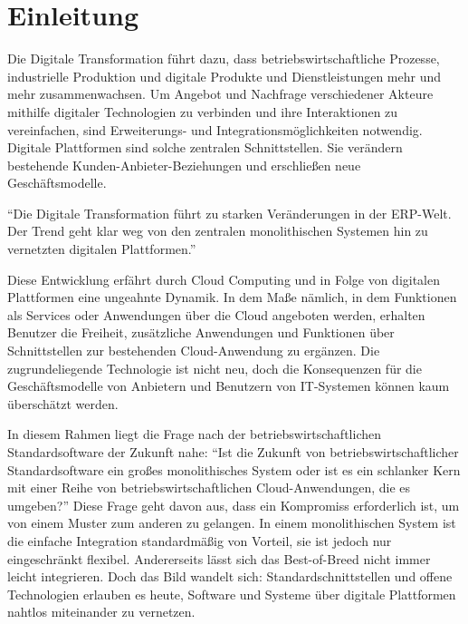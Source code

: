 \chapter{Einleitung}

Die Digitale Transformation führt dazu, dass betriebswirtschaftliche Prozesse, industrielle Produktion und digitale Produkte und Dienstleistungen mehr und mehr zusammenwachsen. Um Angebot und Nachfrage verschiedener Akteure mithilfe digitaler Technologien zu verbinden und ihre Interaktionen zu vereinfachen, sind Erweiterungs- und Integrationsmöglichkeiten notwendig. Digitale Plattformen sind solche zentralen Schnittstellen. Sie verändern bestehende Kunden-Anbieter-Beziehungen und erschließen neue Geschäftsmodelle.
\autocite{Densborn.2018}

\epigraph{
\enquote{Die Digitale Transformation führt zu starken Veränderungen in der ERP-Welt. Der Trend geht klar weg von den zentralen monolithischen Systemen hin zu vernetzten digitalen Plattformen.}
\autocite{bitkom.2018}
}{}

Diese Entwicklung erfährt durch Cloud Computing und in Folge von digitalen Plattformen eine ungeahnte Dynamik. In dem Maße nämlich, in dem Funktionen als Services oder Anwendungen über die Cloud angeboten werden, erhalten Benutzer die Freiheit, zusätzliche Anwendungen und Funktionen über Schnittstellen zur bestehenden Cloud-Anwendung zu ergänzen. Die zugrundeliegende Technologie ist nicht neu, doch die Konsequenzen für die Geschäftsmodelle von Anbietern und Benutzern von \acs{IT}-Systemen können kaum überschätzt werden.
\autocite{bitkom.2018}

In diesem Rahmen liegt die Frage nach der betriebswirtschaftlichen Standardsoftware der Zukunft nahe:
\enquote{Ist die Zukunft von betriebswirtschaftlicher Standardsoftware ein großes monolithisches System oder ist es ein schlanker Kern mit einer Reihe von betriebswirtschaftlichen Cloud-Anwendungen, die es umgeben?}
Diese Frage geht davon aus, dass ein Kompromiss erforderlich ist, um von einem Muster zum anderen zu gelangen. In einem monolithischen System ist die einfache Integration standardmäßig von Vorteil, sie ist jedoch nur eingeschränkt flexibel. Andererseits lässt sich das Best-of-Breed nicht immer leicht integrieren. Doch das Bild wandelt sich: Standardschnittstellen und offene Technologien erlauben es heute, Software und Systeme über digitale Plattformen nahtlos miteinander zu vernetzen.
\autocite{Henneberger.2010}

